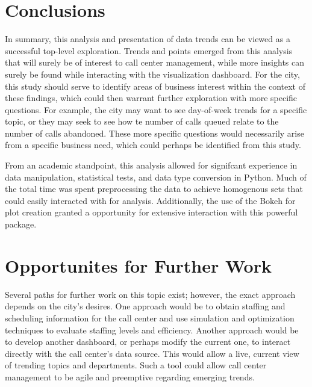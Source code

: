 \documentclass[11pt,twocolumn]{article}
\begin{document}
\section{Conclusions}

In summary, this analysis and presentation of data trends can be viewed as a successful top-level exploration.  Trends and points emerged from this analysis that will surely be of interest to call center management, while more insights can surely be found while interacting with the visualization dashboard.  For the city, this study should serve to identify areas of business interest within the context of these findings, which could then warrant further exploration with more specific questions.  For example, the city may want to see day-of-week trends for a specific topic, or they may seek to see how te number of calls queued relate to the number of calls abandoned.  These more specific questions would necessarily arise from a specific business need, which could perhaps be identified from this study.
\par
From an academic standpoint, this analysis allowed for signifcant experience in data manipulation, statistical tests, and data type conversion in Python.  Much of the total time was spent preprocessing the data to achieve homogenous sets that could easily interacted with for analysis.  Additionally, the use of the Bokeh for plot creation granted a opportunity for extensive interaction with this powerful package.

\section{Opportunites for Further Work}

Several paths for further work on this topic exist; however, the exact approach depends on the city's desires.  One approach would be to obtain staffing and scheduling information for the call center and use simulation and optimization techniques to evaluate staffing levels and efficiency.  Another approach would be to develop another dashboard, or perhaps modify the current one, to interact directly with the call center's data source.  This would allow a live, current view of trending topics and departments.  Such a tool could allow call center management to be agile and preemptive regarding emerging trends.
\end{document}
